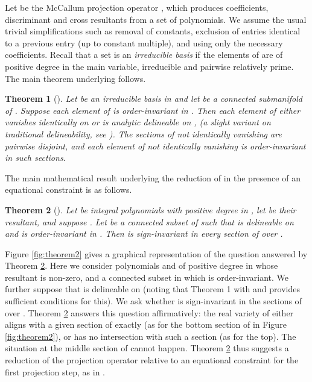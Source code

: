 \documentclass{article}
\newtheorem{theorem}{Theorem}
\begin{document}
Let  be the McCallum projection operator \cite{McCallum1988}, which produces coefficients, discriminant and cross resultants from a set of polynomials.  We assume the usual trivial simplifications such as removal of constants, exclusion of entries identical to a previous entry (up to constant multiple), and using only the necessary coefficients. 
Recall that a set  is an {\em irreducible basis}
if the elements of  are of positive degree in the main variable, irreducible and pairwise relatively prime. 
The main theorem underlying  follows. 

\begin{theorem}[\cite{McCallum1998}]\label{DJW:theorem:SMcCTheorem1}
Let  be an irreducible basis in  and let  be a connected submanifold of . Suppose each element of   is order-invariant in .
\noindent Then each element of  either vanishes identically on  or is analytic delineable on , (a slight variant on traditional delineability, see \cite{McCallum1998}). The sections of  not identically vanishing are pairwise disjoint, and each element of  not identically vanishing is order-invariant in such sections.  
\end{theorem}

The main mathematical result underlying the reduction of  in the presence of an equational constraint  is as follows.

\begin{theorem}[\cite{McCallum1999a}]\label{DJW:theorem:SMcCTheorem2}
Let  be integral polynomials with positive degree in , 
let  be their resultant, and suppose .
Let  be a connected subset of 
such that  is delineable on  and  is order-invariant in . 
Then  is {\em sign-invariant} in every section of  over .
\end{theorem}

Figure \ref{fig:theorem2} gives a graphical representation of the question answered by Theorem \ref{DJW:theorem:SMcCTheorem2}.  Here we consider polynomials  and  of positive degree in  whose resultant  is non-zero, and a connected subset  in which  is order-invariant.  We further suppose that  is delineable on  (noting that Theorem 1 with  and  provides sufficient conditions for this).  We ask whether  is sign-invariant in the sections of  over .  Theorem \ref{DJW:theorem:SMcCTheorem2} answers this question affirmatively:  the real variety of  either aligns with a given section of  exactly (as for the bottom section of  in Figure \ref{fig:theorem2}), or has no intersection with such a section (as for the top). The situation at the middle section of  cannot happen.    
Theorem \ref{DJW:theorem:SMcCTheorem2} thus suggests a reduction of the projection operator  relative to an equational constraint  for the first projection step, as in \cite{McCallum1999a}.
\end{document}

